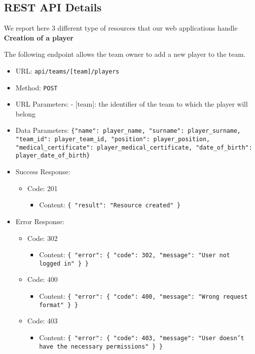 \subsection{REST API Details}

We report here 3 different type of resources that our web applications handle\\
\textbf{Creation of a player}

The following endpoint allows the team owner to add a new player to the team.
\begin{itemize}
    \item URL: \texttt{api/teams/[team]/players}
    \item Method: \texttt{POST}
    \item URL Parameters: - [team]: the identifier of the team to which the player will belong
    \item Data Parameters: \texttt{\{"name": player\_name, "surname": player\_surname, "team\_id": player\_team\_id, "position": player\_position, "medical\_certificate": player\_medical\_certificate, "date\_of\_birth": player\_date\_of\_birth\}}
    \item Success Response:
    \begin{itemize}
        \item Code: 201
            \begin{itemize}
                \item Content: \texttt{\{ "result": "Resource created" \}}
            \end{itemize}
    \end{itemize}
    \item Error Response:
    \begin{itemize}
        \item Code: 302
            \begin{itemize}
                \item Content: \texttt{\{ "error": \{ "code": 302, "message": "User not logged in" \} \}}
            \end{itemize}

        \item Code: 400
            \begin{itemize}
                \item Content: \texttt{\{ "error": \{ "code": 400, "message": "Wrong request format" \} \}}
            \end{itemize}

        \item Code: 403
            \begin{itemize}
                \item Content: \texttt{\{ "error": \{ "code": 403, "message": "User doesn't have the necessary permissions" \} \}}
            \end{itemize}


\end{itemize}
\end{itemize}
